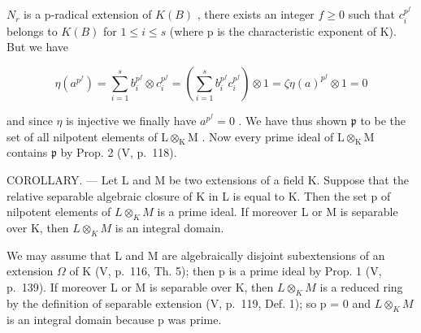 \(N_{r}\) is a p-radical extension of \(K(B)\) , there exists an integer \(f \geqslant 0\) such that \(c_{i}^{p^{f}}\) belongs to \(K(B)\) for \(1 \leqslant i \leqslant s\) (where p is the characteristic exponent of K). But we have

\[
\eta \left(a ^ {p ^ {f}}\right) = \sum_ {i = 1} ^ {s} b _ {i} ^ {p ^ {f}} \otimes c _ {i} ^ {p ^ {f}} = \left(\sum_ {i = 1} ^ {s} b _ {i} ^ {p ^ {f}} c _ {i} ^ {p ^ {f}}\right) \otimes 1 = \zeta \eta (a) ^ {p ^ {f}} \otimes 1 = 0
\]

and since \(\eta\) is injective we finally have \(a^{p^{f}} = 0\) . We have thus shown \(\mathfrak{p}\) to be the set of all nilpotent elements of \(\mathrm{L} \otimes_{\mathrm{K}} \mathrm{M}\) . Now every prime ideal of \(\mathrm{L} \otimes_{\mathrm{K}} \mathrm{M}\) contains \(\mathfrak{p}\) by Prop. 2 (V, p.~118).

COROLLARY. --- Let L and M be two extensions of a field K. Suppose that the relative separable algebraic closure of K in L is equal to K. Then the set p of nilpotent elements of \(L \otimes_{K} M\) is a prime ideal. If moreover L or M is separable over K, then \(L \otimes_{K} M\) is an integral domain.

We may assume that L and M are algebraically disjoint subextensions of an extension \(\Omega\) of K (V, p.~116, Th. 5); then p is a prime ideal by Prop. 1 (V, p.~139). If moreover L or M is separable over K, then \(L \otimes_{K} M\) is a reduced ring by the definition of separable extension (V, p.~119, Def. 1); so p = 0 and \(L \otimes_{K} M\) is an integral domain because p was prime.

